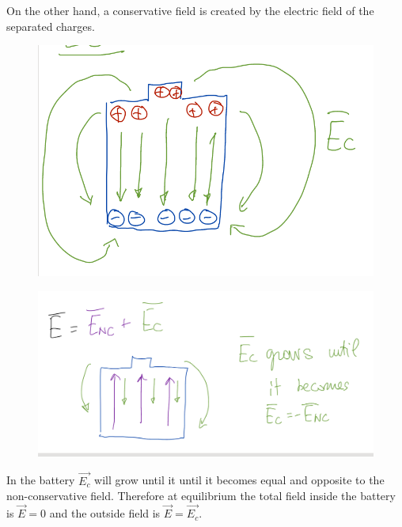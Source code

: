 \documentclass[10pt]{article}
\begin{document}
On the other hand, a conservative field is created by the electric field of the separated charges. 

\begin{figure}[H]
	\centering
	\includegraphics[width=0.8\linewidth]{img/image_2022-04-17-19-16-17.png}
\end{figure}


\begin{figure}[H]
	\centering
	\includegraphics[width=0.8\linewidth]{img/image_2022-04-17-19-11-53.png}
\end{figure}

In the battery $ \vec{E_c} $  will grow until it until it becomes equal and opposite to the non-conservative field. 
Therefore at equilibrium the total field inside the battery is $ \vec{E} = 0 $ and the outside field is $ \vec{E}= \vec{E_c} $.
\end{document}

